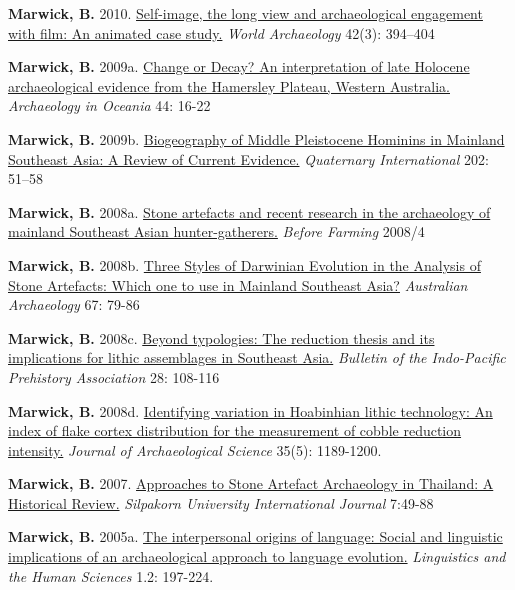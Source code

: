 \documentclass[11pt,article,oneside]{memoir}
\begin{document}
{{{{\ind \textbf{Marwick, B.} 2010. \href{http://faculty.washington.edu/bmarwick/PDFs/Marwick_2010_WA_Wall-E.pdf}{Self-image, the long view and archaeological engagement with film: An animated case study.} \textit{World Archaeology} 42(3): 394–404

\ind \textbf{Marwick, B.} 2009a. \href{http://faculty.washington.edu/bmarwick/PDFs/Marwick_2009_AO_Pilbara.pdf}{Change or Decay? An interpretation of late Holocene archaeological evidence from the Hamersley Plateau, Western Australia.} \textit{Archaeology in Oceania} 44: 16-22

\ind \textbf{Marwick, B.}  2009b. \href{http://faculty.washington.edu/bmarwick/PDFs/Marwick_2009_QI.pdf}{Biogeography of Middle Pleistocene Hominins in Mainland Southeast Asia: A Review of Current Evidence.} \textit{Quaternary International} 202: 51–58

\ind \textbf{Marwick, B.} 2008a. \href{http://faculty.washington.edu/bmarwick/PDFs/Marwick_2008_Before_Farming.pdf}{Stone artefacts and recent research in the archaeology of mainland Southeast Asian hunter-gatherers.} \textit{Before Farming} 2008/4

\ind \textbf{Marwick, B.} 2008b. \href{http://faculty.washington.edu/bmarwick/PDFs/Marwick_2008_AA_3_Styles.pdf}{Three Styles of Darwinian Evolution in the Analysis of Stone Artefacts: Which one to use in Mainland Southeast Asia?} \textit{Australian Archaeology} 67: 79-86

\ind \textbf{Marwick, B.} 2008c. \href{http://faculty.washington.edu/bmarwick/PDFs/Marwick_2008_BIPPA.pdf}{Beyond typologies: The reduction thesis and its implications for lithic assemblages in Southeast Asia.} \textit{Bulletin of the Indo-Pacific Prehistory Association} 28: 108-116

\ind \textbf{Marwick, B.} 2008d. \href{http://faculty.washington.edu/bmarwick/PDFs/Marwick_2008_JAS.pdf}{Identifying variation in Hoabinhian lithic technology: An index of flake cortex distribution for the measurement of cobble reduction intensity.} \textit{ Journal of Archaeological Science} 35(5): 1189-1200.

\ind \textbf{Marwick, B.} 2007. \href{http://faculty.washington.edu/bmarwick/PDFs/Marwick_2007_SIJ.pdf}{Approaches to Stone Artefact Archaeology in Thailand: A Historical Review.} \textit{Silpakorn University International Journal} 7:49-88

\ind \textbf{Marwick, B.} 2005a. \href{http://faculty.washington.edu/bmarwick/PDFs/Marwick_2005_LHE.pdf}{The interpersonal origins of language: Social and linguistic implications of an archaeological approach to language evolution.} \textit{Linguistics and the Human Sciences} 1.2: 197-224.

}}}}
\end{document}
